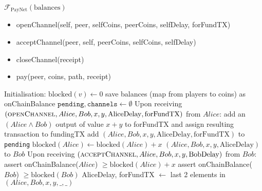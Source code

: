 \begin{functionality}{$\mathcal{F}_{\mathrm{PayNet}}
\left(\mathrm{balances}\right)$}
  \label{alg:payfunc}
    \begin{itemize}
      \item openChannel(self, peer, selfCoins, peerCoins, selfDelay, forFundTX)
      \item acceptChannel(peer, self, peerCoins, selfCoins, selfDelay)
      \item closeChannel(receipt)
      \item pay(peer, coins, path, receipt)
    \end{itemize}
  \begin{algorithmic}[1]
    \State Initialisation:
      \Indent
        \State $\mathrm{blocked}\left(v\right) \gets 0$
      \EndFor
      \State save balances (map from players to coins) as onChainBalance
      \State $\mathtt{pending}, \mathtt{channels} \gets \emptyset$
      \EndIndent
    \State
    \State Upon receiving $\left(\textsc{openChannel}, Alice, Bob, x, y,
    \mathrm{AliceDelay}, \mathrm{forFundTX}\right)$ from $Alice$:
    \Indent
      \State add an $\left(Alice \wedge Bob\right)$ output of value $x + y$ to
      forFundTX and assign resulting transaction to fundingTX
        \State add $\left(Alice, Bob, x, y, \mathrm{AliceDelay},
        \mathrm{forFundTX}\right)$ to \texttt{pending}
        \State $\mathrm{blocked}\left(Alice\right) \leftarrow
        \mathrm{blocked}\left(Alice\right) + x$
        \State \Return $\left(Alice, Bob, x, y, \mathrm{AliceDelay}\right)$ to
        $Bob$ 
      \EndIf
    \EndIndent
    \State
    \State Upon receiving $\left(\textsc{acceptChannel}, Alice, Bob, x, y,
    \mathrm{BobDelay}\right)$ from $Bob$: 
    \Indent
        \State assert onChainBalance($Alice$) $\geq
        \mathrm{blocked}\left(Alice\right) + x$
        \State assert onChainBalance($Bob$) $\geq
        \mathrm{blocked}\left(Bob\right)$
        \State AliceDelay, forFundTX $\gets$ last 2 elements in $\left(Alice,
        Bob, x, y, \_, \_\right)$

\end{algorithmic}
\end{functionality}
